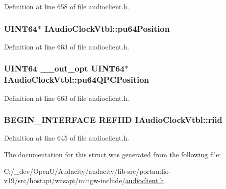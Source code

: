 Definition at line 658 of file audioclient.\+h.

\subsubsection[{\texorpdfstring{pu64\+Position}{pu64Position}}]{ U\+I\+N\+T64$\ast$ I\+Audio\+Clock\+Vtbl\+::pu64\+Position}\hypertarget{struct_i_audio_clock_vtbl_a46f5530e76bd1ede82bef1acaf025588}{}\label{struct_i_audio_clock_vtbl_a46f5530e76bd1ede82bef1acaf025588}


Definition at line 663 of file audioclient.\+h.

\subsubsection[{\texorpdfstring{pu64\+Q\+P\+C\+Position}{pu64QPCPosition}}]{ U\+I\+N\+T64 {\bf \+\_\+\+\_\+out\+\_\+opt} U\+I\+N\+T64$\ast$ I\+Audio\+Clock\+Vtbl\+::pu64\+Q\+P\+C\+Position}\hypertarget{struct_i_audio_clock_vtbl_a1b2d08a23c0bdaa3dea369057be0ea56}{}\label{struct_i_audio_clock_vtbl_a1b2d08a23c0bdaa3dea369057be0ea56}


Definition at line 663 of file audioclient.\+h.

\subsubsection[{\texorpdfstring{riid}{riid}}]{\setlength{\rightskip}{0pt plus 5cm}B\+E\+G\+I\+N\+\_\+\+I\+N\+T\+E\+R\+F\+A\+CE {\bf R\+E\+F\+I\+ID} I\+Audio\+Clock\+Vtbl\+::riid}\hypertarget{struct_i_audio_clock_vtbl_ae5112c231e7b7a6e97176edcd69bf501}{}\label{struct_i_audio_clock_vtbl_ae5112c231e7b7a6e97176edcd69bf501}


Definition at line 645 of file audioclient.\+h.



The documentation for this struct was generated from the following file\+:\begin{DoxyCompactItemize}
\item 
C\+:/\+\_\+dev/\+Open\+U/\+Audacity/audacity/lib-\/src/portaudio-\/v19/src/hostapi/wasapi/mingw-\/include/\hyperlink{audioclient_8h}{audioclient.\+h}\end{DoxyCompactItemize}
